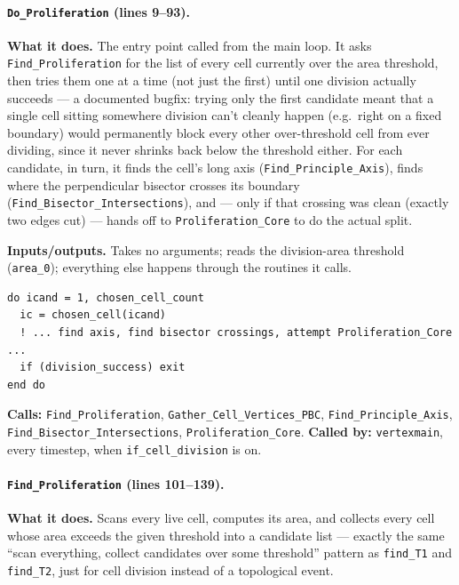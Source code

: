 \documentclass[11pt]{article}
\begin{document}
\paragraph{\texttt{Do\_Proliferation} (lines 9--93).}
\textbf{What it does.} The entry point called from the main loop. It asks
\texttt{Find\_Proliferation} for the list of every cell currently over the area
threshold, then tries them one at a time (not just the first) until one division
actually succeeds --- a documented bugfix: trying only the first candidate meant that a
single cell sitting somewhere division can't cleanly happen (e.g.\ right on a fixed
boundary) would permanently block every other over-threshold cell from ever dividing,
since it never shrinks back below the threshold either. For each candidate, in turn, it
finds the cell's long axis (\texttt{Find\_Principle\_Axis}), finds where the
perpendicular bisector crosses its boundary (\texttt{Find\_Bisector\_Intersections}),
and --- only if that crossing was clean (exactly two edges cut) --- hands off to
\texttt{Proliferation\_Core} to do the actual split.

\textbf{Inputs/outputs.} Takes no arguments; reads the division-area threshold
(\texttt{area\_0}); everything else happens through the routines it calls.

\begin{lstlisting}[caption={Falling through to the next candidate cell if one fails to divide, in \texttt{Do\_Proliferation}.}]
do icand = 1, chosen_cell_count
  ic = chosen_cell(icand)
  ! ... find axis, find bisector crossings, attempt Proliferation_Core ...
  if (division_success) exit
end do
\end{lstlisting}

\textbf{Calls:} \texttt{Find\_Proliferation}, \texttt{Gather\_Cell\_Vertices\_PBC},
\texttt{Find\_Principle\_Axis}, \texttt{Find\_Bisector\_Intersections},
\texttt{Proliferation\_Core}. \textbf{Called by:} \texttt{vertexmain}, every timestep,
when \texttt{if\_cell\_division} is on.

\paragraph{\texttt{Find\_Proliferation} (lines 101--139).}
\textbf{What it does.} Scans every live cell, computes its area, and collects every
cell whose area exceeds the given threshold into a candidate list --- exactly the same
``scan everything, collect candidates over some threshold'' pattern as \texttt{find\_T1}
and \texttt{find\_T2}, just for cell division instead of a topological event.
\end{document}
